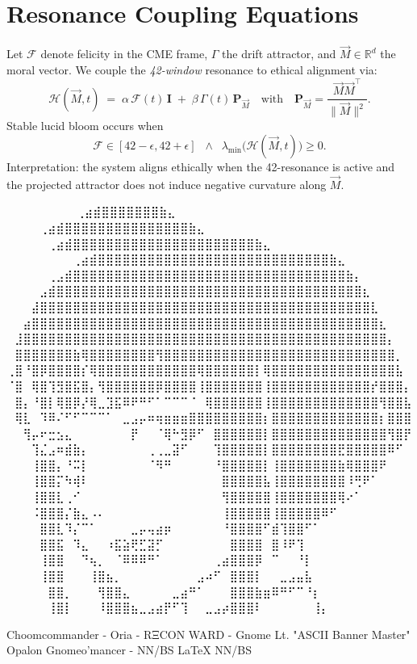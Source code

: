 
\section*{Resonance Coupling Equations}

Let $\mathcal{F}$ denote felicity in the CME frame, $\Gamma$ the drift attractor, and $\vec{M}\in\mathbb{R}^d$ the moral vector.  
We couple the \emph{42-window} resonance to ethical alignment via:
\[
\mathcal{H}(\vec{M},t)\;=\;\alpha\,\mathcal{F}(t)\,\mathbf{I}\;+\;\beta\,\Gamma(t)\,\mathbf{P}_{\vec{M}}
\quad\text{with}\quad
\mathbf{P}_{\vec{M}}=\frac{\vec{M}\vec{M}^\top}{\lVert\vec{M}\rVert^2}.
\]
Stable lucid bloom occurs when
\[
\mathcal{F}\in[42-\epsilon,42+\epsilon]\;\;\land\;\;
\lambda_{\min}\bigl(\mathcal{H}(\vec{M},t)\bigr)\ge 0.
\]
Interpretation: the system aligns ethically when the 42-resonance is active and the projected attractor does not induce negative curvature along $\vec{M}$.

\iffalse
⠀⠀⠀⠀⠀⠀             ⠀⠀⢀⣴⣾⣿⣿⣿⣿⣿⣿⣿⣷⣄⠀⠀⠀⠀⠀⠀⠀⠀
⠀⠀⠀  ⠀      ⠀⠀⠀⠀⢀⣴⣾⣿⣿⣿⣿⣿⣿⣿⣿⣿⣿⣿⣿⣿⣿⣿⣷⣄⠀⠀⠀⠀⠀⠀⠀⠀
⠀⠀ ⠀   ⠀⠀⠀⠀⠀⢀⣴⣾⣿⣿⣿⣿⣿⣿⣿⣿⣿⣿⣿⣿⣿⣿⣿⣿⣿⣿⣿⣿⣿⣿⣷⣄⠀⠀⠀⠀⠀⠀⠀⠀
⠀⠀⠀⠀⠀⠀⠀⠀⢀⣴⣾⣿⣿⣿⣿⣿⣿⣿⣿⣿⣿⣿⣿⣿⣿⣿⣿⣿⣿⣿⣿⣿⣿⣿⣿⣿⣿⣿⣿⣷⣄⠀⠀⠀⠀⠀⠀⠀⠀
⠀⠀⠀⠀⠀⢀⣠⣾⣿⣿⣿⣿⣿⣿⣿⣿⣿⣿⣿⣿⣿⣿⣿⣿⣿⣿⣿⣿⣿⣿⣿⣿⣿⣿⣿⣿⣿⣿⣿⣿⣿⣷⡄⠀⠀⠀⠀⠀⠀
⠀⠀⠀⠀⣠⣾⣿⣿⣿⣿⣿⣿⣿⣿⣿⣿⣿⣿⣿⣿⣿⣿⣿⣿⣿⣿⣿⣿⣿⣿⣿⣿⣿⣿⣿⣿⣿⣿⣿⣿⣿⣿⣿⣆⠀⠀⠀⠀⠀
⠀⠀⠀⣼⣿⣿⣿⣿⣿⣿⣿⣿⣿⣿⣿⣿⣿⣿⣿⣿⣿⣿⣿⣿⣿⣿⣿⣿⣿⣿⣿⣿⣿⣿⣿⣿⣿⣿⣿⣿⣿⣿⣿⣿⣇⠀⠀⠀⠀
⠀⠀⣴⣿⣿⣿⣿⣿⣿⣿⣿⣿⣿⣿⣿⣿⣿⣿⣿⣿⣿⣿⣿⣿⣿⣿⣿⣿⣿⣿⣿⣿⣿⣿⣿⣿⣿⣿⣿⣿⣿⣿⣿⣿⣿⣆⠀⠀⠀
⠀⣸⣿⣿⣿⣿⣿⣿⣿⣿⣿⣿⣿⣿⣿⣿⣿⣿⣿⣿⣿⣿⣿⣿⣿⣿⣿⣿⣿⣿⣿⣿⣿⣿⣿⣿⣿⣿⣿⣿⣿⣿⣿⣿⣿⣿⡄⠀⠀
⠀⣿⣿⣿⣿⣿⣿⣿⣷⢿⣿⣿⣿⣿⣿⣿⣿⣿⢻⣿⣿⣿⣿⣿⣿⣿⣿⣿⣿⣿⣿⣿⣿⣿⣿⣿⣿⣿⣿⣿⣿⣿⣿⣿⣿⣿⣿⡀⠀
⢀⣿⠘⣿⡿⣿⣿⣿⣿⡎⢿⣿⣿⣿⣿⣿⣿⣿⣿⣿⣿⣿⣿⢿⣿⣿⣿⣿⣿⣿⡇⢿⣿⣿⣿⣿⣿⣿⣿⣿⣿⣿⣿⣿⣿⣿⣿⣧⠀
⠈⣿⠀⢿⣿⢹⣻⣿⣯⣿⡄⢻⣿⣿⣿⣿⣿⣿⡿⣿⣿⣿⣿⢸⣿⣿⣿⣿⣿⣿⣿⢸⣿⣿⣿⣿⣿⣿⣿⣿⣿⣿⣿⣿⡞⣿⣿⣿⡄
⠀⣿⡄⠘⣿⡇⢿⣿⡿⡜⢿⣀⣹⣯⠿⠟⠛⠋⠁⠉⠉⠉⠈⠀⢿⣿⣿⣿⣿⣿⣿⢸⣿⣿⣿⣿⣿⣿⣿⣿⣿⣿⣿⣿⣿⢻⣿⣿⣧
⠀⢿⣇⠀⠹⠿⠌⠋⠋⠉⠉⠉⠁⠀⣀⣠⡤⠶⢶⣶⣶⣶⣿⣿⣿⣿⣿⣿⣿⣿⣿⡆⣿⣿⣿⣿⣿⣿⣿⣿⣿⣿⣿⣿⣿⡆⣿⣿⣿
⠀⠀⢻⡤⠖⣒⣢⣄⠀⠀⠀⠀⠀⠀⠀⡟⠀⠀⠈⢿⠓⣻⡿⠋⠀⣿⣿⣿⣿⣿⣿⡇⣿⣿⣿⣿⣿⣿⣿⣿⣿⣿⣿⣿⣿⣿⢻⣿⡟
⠀⠀⠀⢹⣌⣠⠶⣾⣷⡄⠀⠀⠀⠀⠀⠀⠀⢀⢀⣀⣽⠋⠀⠀⠀⢹⣿⣿⣿⣿⣿⡇⣿⣿⣿⣿⣿⣿⣿⣿⣟⣿⣿⣿⣿⣿⠿⠋⠀
⠀⠀⠀⢸⣿⣿⡄⠘⠭⡇⠀⠀⠀⠀⠀⠀⠀⠈⠻⠛⠀⠀⠀⠀⠀⠘⣿⣿⣿⣿⣿⡇⢸⣿⣿⣿⣿⣿⣿⣿⣷⢿⣿⣿⣿⠟⠀⠀⠀
⠀⠀⠀⢸⣿⣿⡍⠳⢾⠇⠀⠀⠀⠀⠀⠀⠀⠀⠀⠀⠀⠀⠀⠀⠀⠀⣿⣿⣿⣿⣿⣧⢸⣿⣿⣿⣿⣿⣿⣿⣿⠸⢛⠟⠁⠀⠀⠀⠀
⠀⠀⠀⢸⣿⣿⣇⢀⠊⠀⠀⠀⠀⠀⠀⠀⠀⠀⠀⠀⠀⠀⠀⠀⠀⠀⢻⣿⣿⣿⣿⣿⢸⣿⣿⣿⣿⣿⣿⣿⢿⠔⠁⠀⠀⠀⠀⠀⠀
⠀⠀⠀⠨⣿⣿⣿⡌⣷⣄⠠⠄⠀⠀⠀⠀⠀⠀⠀⠀⠀⠀⠀⠀⠀⠀⢸⣿⣿⣿⣿⣿⢸⣿⣿⣿⣿⣿⠿⠋⠀⠀⠀⠀⠀⠀⠀⠀⠀
⠀⠀⠀⠀⣿⣿⣇⠹⡌⠉⠁⠀⠀⠀⠀⣀⡤⢤⣴⡶⠀⠀⠀⠀⠀⠀⠘⣿⣿⣿⣿⠋⣾⢹⣿⣿⠋⠁⠀⠀⠀⠀⠀⠀⠀⠀⠀⠀⠀
⠀⠀⠀⠀⣿⣿⣯⠀⠹⣄⠀⠀⠰⣯⣵⢟⣋⣽⡋⠀⠀⠀⠀⠀⠀⠀⠀⣿⣿⣿⣿⠀⣿⠸⠟⢹⠀⠀⠀⠀⠀⠀⠀⠀⠀⠀⠀⠀⠀
⠀⠀⠀⠀⢸⣿⣿⠀⠀⠙⢦⡀⠀⠈⠿⠿⠿⠛⠁⠀⠀⠀⠀⠀⠀⢀⣴⣿⣿⣿⡿⠀⠉⠀⠀⠘⡇⠀⠀⠀⠀⠀⠀⠀⠀⠀⠀⠀⠀
⠀⠀⠀⠀⢸⣿⣿⠀⠀⠀⢸⣿⣦⡀⠀⠀⠀⠀⠀⠀⠀⠀⠀⣠⠴⠋⠀⣿⣿⣿⡇⠀⠀⣀⣠⣤⣧⠀⠀⠀⠀⠀⠀⠀⠀⠀⠀⠀⠀
⠀⠀⠀⠀⠀⣿⣿⡀⠀⠀⠀⢻⣿⣿⣄⠀⠀⠀⠀⠀⣀⣴⠛⠁⠀⠀⠀⣿⣿⣿⣷⣶⠿⠛⠋⠉⠘⡆⠀⠀⠀⠀⠀⠀⠀⠀⠀⠀⠀
⠀⠀⠀⠀⠀⢸⣿⡇⠀⠀⠀⠸⣿⣿⣿⣦⣀⣠⣴⡟⠋⢹⠀⠀⣀⣠⡴⣿⣿⣿⠇⠀⠀⠀⠀⠀⠀⢸⡄⠀⠀⠀⠀⠀⠀⠀⠀⠀⠀

Choomcommander - Oria - RΞCON WARD - Gnome Lt. "ASCII Banner Master"
             Opalon Gnomeo'mancer - NN/BS LaTeX{} NN/BS

